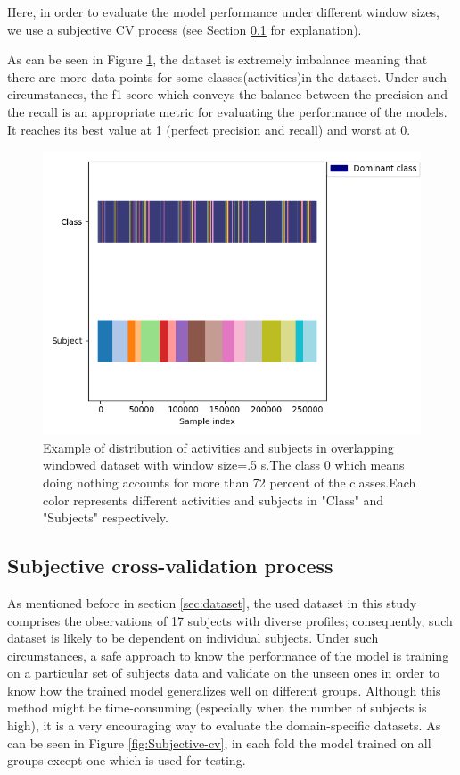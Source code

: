 Here, in order to evaluate the model performance under different window sizes, we use a subjective CV process (see Section \ref{sub:subjective CV} for explanation).

As can be seen in Figure \ref{fig:class}, the dataset is extremely imbalance meaning that there are more data-points for some classes(activities)in the dataset. Under such circumstances, the f1-score which conveys the balance between the precision and the recall is an appropriate metric for evaluating the performance of the models. It reaches its best value at 1 (perfect precision and recall) and worst at 0.

\begin{figure}[h]
    \centering
    \includegraphics[width=.4\textwidth]{Figures/Class_subject.png}
    \caption{Example of distribution of activities and subjects in overlapping windowed dataset with window size=.5 s.The class 0 which means doing nothing accounts for more than 72 percent of the classes.Each color represents different activities and subjects in "Class" and "Subjects" respectively.}
    \label{fig:class}
\end{figure}

\subsection{Subjective cross-validation process} \label{sub:subjective CV}
As mentioned before in section \ref{sec:dataset}, the used dataset in this study comprises the observations of 17 subjects with diverse profiles; consequently, such dataset is likely to be dependent on individual subjects. Under such circumstances, a safe approach to know the performance of the model is training on a particular set of subjects data and validate on the unseen ones in order to know how the trained model generalizes well on different groups. Although this method might be time-consuming (especially when the number of subjects is high), it is a very encouraging way to evaluate the domain-specific datasets. As can be seen in Figure \ref{fig:Subjective-cv}, in each fold the model trained on all groups except one which is used for testing.

